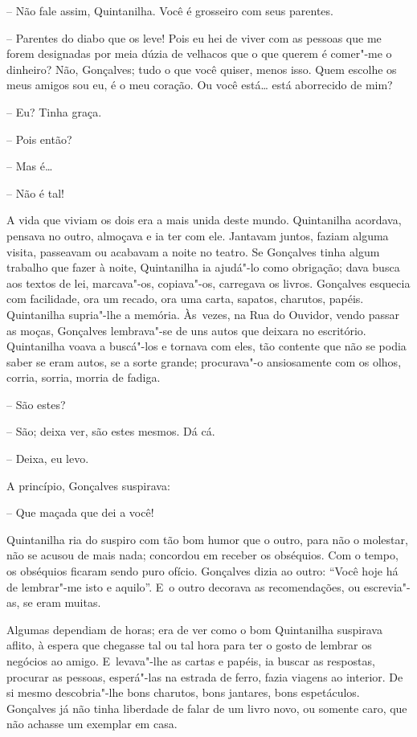 -- Não fale assim, Quintanilha. Você é grosseiro com seus parentes.

-- Parentes do diabo que os leve! Pois eu hei de viver com as pessoas
que me forem designadas por meia dúzia de velhacos que o que querem é
comer"-me o dinheiro? Não, Gonçalves; tudo o que você quiser, menos isso.
Quem escolhe os meus amigos sou eu, é o meu coração. Ou você está\ldots{}
está aborrecido de mim?

-- Eu? Tinha graça.

-- Pois então?

-- Mas é\ldots{}

-- Não é tal!

A vida que viviam os dois era a mais unida deste mundo. Quintanilha
acordava, pensava no outro, almoçava e ia ter com ele. Jantavam juntos,
faziam alguma visita, passeavam ou acabavam a noite no teatro. Se
Gonçalves tinha algum trabalho que fazer à noite, Quintanilha ia
ajudá"-lo como obrigação; dava busca aos textos de lei, marcava"-os,
copiava"-os, carregava os livros. Gonçalves esquecia com facilidade, ora
um recado, ora uma carta, sapatos, charutos, papéis. Quintanilha
supria"-lhe a memória. Às~vezes, na Rua do Ouvidor, vendo passar as
moças, Gonçalves lembrava"-se de uns autos que deixara no escritório.
Quintanilha voava a buscá"-los e tornava com eles, tão contente que não
se podia saber se eram autos, se a sorte grande; procurava"-o
ansiosamente com os olhos, corria, sorria, morria de fadiga.

-- São estes?

-- São; deixa ver, são estes mesmos. Dá cá.

-- Deixa, eu levo.

A princípio, Gonçalves suspirava:

-- Que maçada que dei a você!

Quintanilha ria do suspiro com tão bom humor que o outro, para não o
molestar, não se acusou de mais nada; concordou em receber os obséquios.
Com o tempo, os obséquios ficaram sendo puro ofício. Gonçalves dizia ao
outro: ``Você hoje há de lembrar"-me isto e aquilo''. E~o outro decorava
as recomendações, ou escrevia"-as, se eram muitas.

Algumas dependiam de horas; era de ver como o bom Quintanilha suspirava
aflito, à espera que chegasse tal ou tal hora para ter o gosto de
lembrar os negócios ao amigo. E~levava"-lhe as cartas e papéis, ia buscar
as respostas, procurar as pessoas, esperá"-las na estrada de ferro, fazia
viagens ao interior. De si mesmo descobria"-lhe bons charutos, bons
jantares, bons espetáculos. Gonçalves já não tinha liberdade de falar de
um livro novo, ou somente caro, que não achasse um exemplar em casa.

